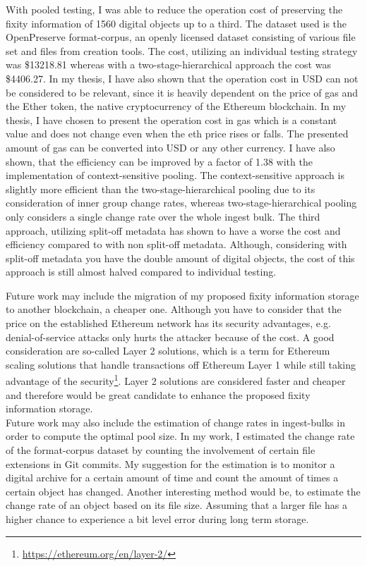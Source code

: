With pooled testing, I was able to reduce the operation cost of preserving the fixity information of 1560 digital objects up to a third. The dataset used is the OpenPreserve format-corpus, an openly licensed dataset consisting of various file set and files from creation tools. The cost, utilizing an individual testing strategy was \$13218.81 whereas with a two-stage-hierarchical approach the cost was \$4406.27. In my thesis, I have also shown that the operation cost in USD can not be considered to be relevant, since it is heavily dependent on the price of gas and the Ether token, the native cryptocurrency of the Ethereum blockchain. In my thesis, I have chosen to present the operation cost in gas which is a constant value and does not change even when the \acrlong{eth} price rises or falls. The presented amount of gas can be converted into USD or any other currency. I have also shown, that the efficiency can be improved by a factor of 1.38 with the implementation of context-sensitive pooling. The context-sensitive approach is slightly more efficient than the two-stage-hierarchical pooling due to its consideration of inner group change rates, whereas two-stage-hierarchical pooling only considers a single change rate over the whole ingest bulk.
The third approach, utilizing split-off metadata has shown to have a worse the cost and efficiency compared to with non split-off metadata. Although, considering with split-off metadata you have the double amount of digital objects, the cost of this approach is still almost halved compared to individual testing.

Future work may include the migration of my proposed fixity information storage to another blockchain, a cheaper one. Although you have to consider that the price on the established Ethereum network has its security advantages, e.g. denial-of-service attacks only hurts the attacker because of the cost. A good consideration are so-called Layer 2 solutions, which is a term for Ethereum scaling solutions that handle transactions off Ethereum Layer 1 while still taking advantage of the security\footnote{\url{https://ethereum.org/en/layer-2/}}. Layer 2 solutions are considered faster and cheaper and therefore would be great candidate to enhance the proposed fixity information storage.\\
Future work may also include the estimation of change rates in ingest-bulks in order to compute the optimal pool size. In my work, I estimated the change rate of the format-corpus dataset by counting the involvement of certain file extensions in Git commits. My suggestion for the estimation is to monitor a digital archive for a certain amount of time and count the amount of times a certain object has changed. Another interesting method would be, to estimate the change rate of an object based on its file size. Assuming that a larger file has a higher chance to experience a bit level error during long term storage.

